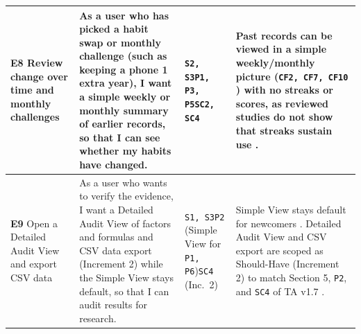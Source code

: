 \documentclass[12pt, a4paper]{article}
\begin{document}
{\begin{longtable}{|>{\raggedright\arraybackslash}p{2.7cm}|>{\raggedright\arraybackslash}p{5.2cm}|>{\raggedright\arraybackslash}p{2.9cm}|>{\raggedright\arraybackslash}p{5.2cm}|}
\hline
\textbf{E8} Review change over time and monthly challenges & As a user who has picked a habit swap or monthly challenge (such as keeping a phone 1 extra year), I want a simple weekly or monthly summary of earlier records, so that I can see whether my habits have changed. & \texttt{S2, S3}\newline \texttt{P1, P3, P5}\newline \texttt{SC2, SC4} & Past records can be viewed in a simple weekly/monthly picture (\texttt{CF2, CF7, CF10} \cite{cf2,cf7,cf10}) with no streaks or scores, as reviewed studies do not show that streaks sustain use \cite{hoffmann2024,froehlich2010}. \\
\hline
\textbf{E9} Open a Detailed Audit View and export CSV data & As a user who wants to verify the evidence, I want a Detailed Audit View of factors and formulas and CSV data export (Increment 2) while the Simple View stays default, so that I can audit results for research. & \texttt{S1, S3}\newline \texttt{P2} (Simple View for \texttt{P1, P6})\newline \texttt{SC4} (Inc.\ 2) & Simple View stays default for newcomers \cite{hoffmann2024}. Detailed Audit View and CSV export are scoped as Should-Have (Increment 2) to match Section 5, \texttt{P2}, and \texttt{SC4} of TA v1.7 \cite{cf4}. \\
\hline


\end{longtable}}
\end{document}
